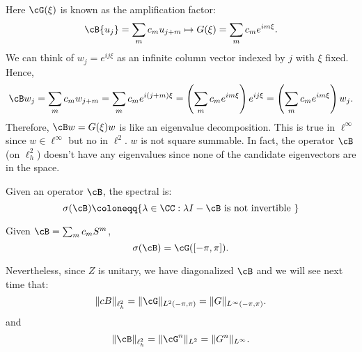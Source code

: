 Here $\cG(\xi )$ is known as the amplification factor: 
\[
    \cB{u_j} = \sum_m c_m u_{j+m} \mapsto G(\xi) = \sum_m c_m e^{im\xi}. 
\]
We can think of $w_j = e^{ij \xi }$ as an infinite column vector indexed by $j$ with $\xi $ fixed. Hence, 
\[
    \cB w_j = \sum_{m} c_m w_{j+m} = \sum_{m} c_m e^{i(j+m)\xi } = \left( \sum_{m} c_m e^{im\xi}  \right) e^{ij \xi } = \left( \sum_{m} c_m e^{im\xi}  \right)w_j. 
\]
Therefore, $ \cB w = G(\xi ) w $ is like an eigenvalue decomposition.  This is true in $\ell ^\infty$ since $w\in \ell ^\infty$ but no in $\ell ^2$. $w$ is not square summable.  In fact, the operator $\cB$ (on $\ell_h^2$) doesn't have any eigenvalues since none of the candidate eigenvectors are in the space.  


\begin{definition}
\label{def: Spectrum of operator}
Given an operator $\cB$, the spectral is: 
\[
    \sigma (\cB) \coloneqq \{\lambda \in \CC: \lambda I - \cB \text{ is not invertible }\} 
\]
\end{definition}


\begin{proposition}
[Spectrum of $\cB$]
\label{prop: Spectrum of cB}
Given $\cB = \sum_{m} c_m S^m$, 
\[
    \sigma(\cB) = \cG([-\pi, \pi]). 
\] 
\end{proposition}

Nevertheless, since $Z$ is unitary, we have diagonalized $\cB$ and we will see next time that: 
\[
    \|cB\|_{\ell_h^2} = \|\cG\|_{L^2(-\pi, \pi)} = \|G\|_{L^\infty (-\pi,\pi)}. 
\]
and 
\[
    \|\cB\|_{ \ell_h^2 }  = \| \cG^n\|_{ L^2 } =  \| G^n\|_{ L^\infty }.  
\]
